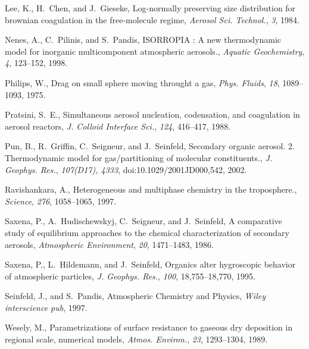 Lee, K., H.~Chen, and J.~Gieseke, Log-normally preserving size distribution for
  brownian coagulation in the free-molecule regime, {\it Aerosol Sci.
  Technol.\/}, {\it 3\/}, 1984.

Nenes, A., C.~Pilinis, and S.~Pandis, {ISORROPIA} : {A} new thermodynamic model
  for inorganic multicomponent atmospheric aerosols., {\it Aquatic
  Geochemistry\/}, {\it 4\/}, 123--152, 1998.

Philips, W., Drag on small sphere moving throught a gas, {\it Phys. Fluids\/},
  {\it 18\/}, 1089--1093, 1975.

Pratsini, S.~E., Simultaneous aerosol nucleation, codensation, and coagulation
  in aerosol reactors, {\it J. Colloid Interface Sci.\/}, {\it 124\/},
  416--417, 1988.

Pun, B., R.~Griffin, C.~Seigneur, and J.~Seinfeld, Secondary organic aerosol.
  2. {T}hermodynamic model for gas/partitioning of molecular constituents.,
  {\it J. Geophys. Res.\/}, {\it 107(D17), 4333\/}, doi:10.1029/2001JD000,542,
  2002.

Ravishankara, A., Heterogeneous and multiphase chemistry in the troposphere.,
  {\it Science\/}, {\it 276\/}, 1058--1065, 1997.

Saxena, P., A.~Hudischewskyj, C.~Seigneur, and J.~Seinfeld, A comparative study
  of equilibrium approaches to the chemical characterization of secondary
  aerosols, {\it Atmospheric Environment\/}, {\it 20\/}, 1471--1483, 1986.

Saxena, P., L.~Hildemann, and J.~Seinfeld, Organics alter hygroscopic behavior
  of atmospheric particles, {\it J. Geophys. Res.\/}, {\it 100\/},
  18,755--18,770, 1995.

Seinfeld, J., and S.~Pandis, Atmospheric {C}hemistry and {P}hysics, {\it Wiley
  interscience pub\/}, 1997.

Wesely, M., Parametrizations of surface resistance to gaseous dry deposition in
  regional scale, numerical models, {\it Atmos. Environ.\/}, {\it 23\/},
  1293--1304, 1989.

